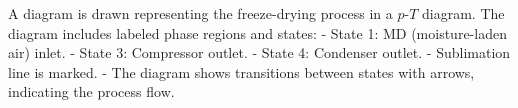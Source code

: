 A diagram is drawn representing the freeze-drying process in a \( p \)-\( T \) diagram. The diagram includes labeled phase regions and states:  
- State 1: MD (moisture-laden air) inlet.  
- State 3: Compressor outlet.  
- State 4: Condenser outlet.  
- Sublimation line is marked.  
- The diagram shows transitions between states with arrows, indicating the process flow.